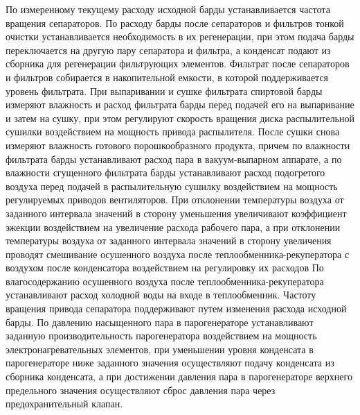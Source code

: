 По измеренному текущему расходу исходной барды устанавливается частота вращения сепараторов.
По расходу барды после сепараторов и фильтров тонкой очистки устанавливается необходимость в их регенерации, при этом подача барды переключается на другую пару сепаратора и фильтра, а конденсат подают из сборника для регенерации фильтрующих элементов.
Фильтрат после сепараторов и фильтров собирается в накопительной емкости, в которой поддерживается уровень фильтрата.
При выпаривании и сушке фильтрата спиртовой барды измеряют влажность и расход фильтрата барды перед подачей его на выпаривание и затем на сушку, при этом регулируют скорость вращения диска распылительной сушилки воздействием на мощность привода распылителя.
После сушки снова измеряют влажность готового порошкообразного продукта, причем по влажности фильтрата барды устанавливают расход пара в вакуум-выпарном аппарате, а по влажности сгущенного фильтрата барды устанавливают расход подогретого воздуха перед подачей в распылительную сушилку воздействием на мощность регулируемых приводов вентиляторов.
При отклонении температуры воздуха от заданного интервала значений в сторону уменьшения увеличивают коэффициент эжекции воздействием на увеличение расхода рабочего пара, а при отклонении температуры воздуха от заданного интервала значений в сторону увеличения проводят смешивание осушенного воздуха после теплообменника-рекуператора с воздухом после конденсатора воздействием на регулировку их расходов
По влагосодержанию осушенного воздуха после теплообменника-рекуператора устанавливают расход холодной воды на входе в теплообменник.
Частоту вращения привода сепаратора поддерживают путем изменения расхода исходной барды.
По давлению насыщенного пара в парогенераторе устанавливают заданную производительность парогенератора воздействием на мощность электронагревательных элементов, при уменьшении уровня конденсата в парогенераторе ниже заданного значения осуществляют подачу конденсата из сборника конденсата, а при достижении давления пара в парогенераторе верхнего предельного значения осуществляют сброс давления пара через предохранительный клапан.


